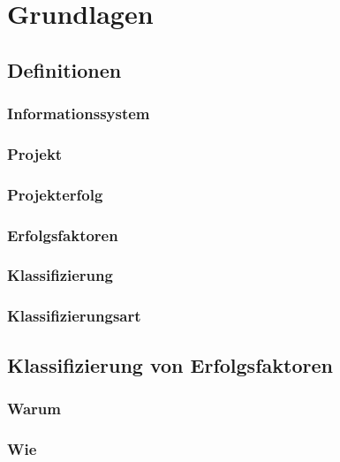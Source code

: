 \documentclass[12pt,a4paper,oneside]{article}
\newcommand{\EF}{Erfolgsfaktoren }
\begin{document}
\section{Grundlagen}
\subsection{Definitionen}

\subsubsection{Informationssystem}


\subsubsection{Projekt}


\subsubsection{Projekterfolg}


\subsubsection{Erfolgsfaktoren}


\subsubsection{Klassifizierung}


\subsubsection{Klassifizierungsart}


\subsection{Klassifizierung von \EF}

\subsubsection{Warum}
\subsubsection{Wie}
\end{document}
